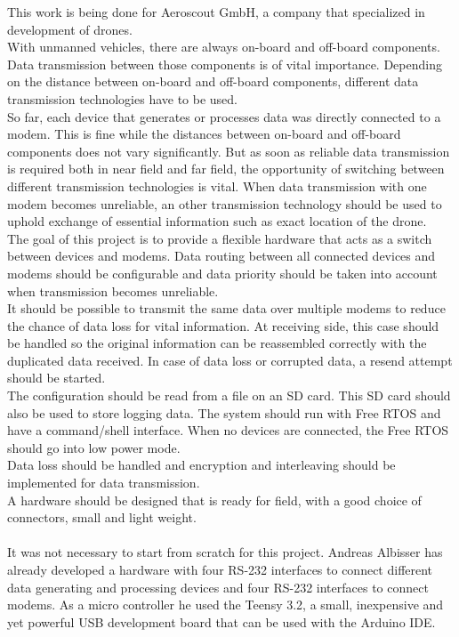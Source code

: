 %
This work is being done for Aeroscout GmbH, a company that specialized in development of drones. \\
With unmanned vehicles, there are always on-board and off-board components. Data transmission between those components is of vital importance. Depending on the distance between on-board and off-board components, different data transmission technologies have to be used. \\
So far, each device that generates or processes data was directly connected to a modem. This is fine while the distances between on-board and off-board components does not vary significantly. But as soon as reliable data transmission is required both in near field and far field, the opportunity of switching between different transmission technologies is vital. When data transmission with one modem becomes unreliable, an other transmission technology should be used to uphold exchange of essential information such as exact location of the drone.\\
The goal of this project is to provide a flexible hardware that acts as a switch between devices and modems. Data routing between all connected devices and modems should be configurable and data priority should be taken into account when transmission becomes unreliable.\\
It should be possible to transmit the same data over multiple modems to reduce the chance of data loss for vital information. At receiving side, this case should be handled so the original information can be reassembled correctly with the duplicated data received. In case of data loss or corrupted data, a resend attempt should be started.\\
The configuration should be read from a file on an SD card. This SD card should also be used to store logging data. The system should run with Free RTOS and have a command/shell interface. When no devices are connected, the Free RTOS should go into low power mode.\\
Data loss should be handled and encryption and interleaving should be implemented for data transmission.\\
A hardware should be designed that is ready for field, with a good choice of connectors, small and light weight.\\ 
\\
It was not necessary to start from scratch for this project. Andreas Albisser has already developed a hardware with four RS-232 interfaces to connect different data generating and processing devices and four RS-232 interfaces to connect modems. As a micro controller he used the Teensy 3.2, a small, inexpensive and yet powerful USB development board that can be used with the Arduino IDE.\\
